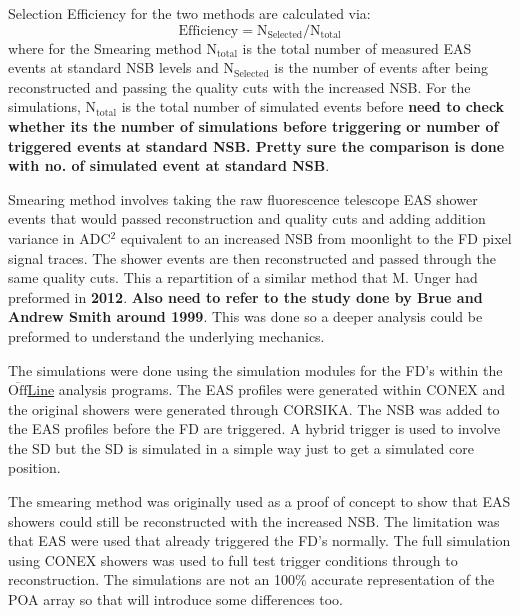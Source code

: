 Selection Efficiency for the two methods are calculated via:
\begin{equation}
\mathrm{Efficiency} = \mathrm{N}_{\mathrm{Selected}} / \mathrm{N}_{\mathrm{total}}
\end{equation}
where for the Smearing method N$_{\mathrm{total}}$ is the total number of measured EAS events at standard NSB levels and N$_{\mathrm{Selected}}$ is the number of events after being reconstructed and passing the quality cuts with the increased NSB. For the simulations, N$_{\mathrm{total}}$ is the total number of simulated events before \textbf{need to check whether its the number of simulations before triggering or number of triggered events at standard NSB. Pretty sure the comparison is done with no. of simulated event at standard NSB}.

Smearing method involves taking the raw fluorescence telescope EAS shower events that would passed reconstruction and quality cuts and adding addition variance in ADC$^2$ equivalent to an increased NSB from moonlight to the FD pixel signal traces. The shower events are then reconstructed and passed through the same quality cuts. This a repartition of a similar method that M. Unger had preformed in \textbf{2012}. \textbf{Also need to refer to the study done by Brue and Andrew Smith around 1999}. This was done so a deeper analysis could be preformed to understand the underlying mechanics. 

The simulations were done using the simulation modules for the FD's within the $\overline{\mathrm{Off}}$\underline{Line} analysis programs. The EAS profiles were generated within CONEX and the original showers were generated through CORSIKA. The NSB was added to the EAS profiles before the FD are triggered. A hybrid trigger is used to involve the SD but the SD is simulated in a simple way just to get a simulated core position.

The smearing method was originally used as a proof of concept to show that EAS showers could still be reconstructed with the increased NSB. The limitation was that EAS were used that already triggered the FD's normally. The full simulation using CONEX showers was used to full test trigger conditions through to reconstruction. The simulations are not an 100\% accurate representation of the POA array so that will introduce some differences too.


